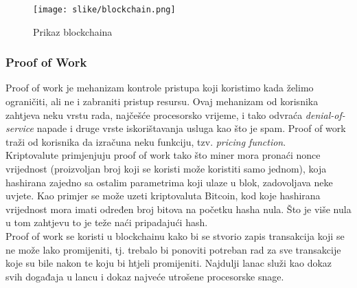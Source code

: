 \documentclass[12pt]{article}
\begin{document}
\begin{figure}[h!]
	\centering
	\texttt{[image: slike/blockchain.png]}
	\caption{Prikaz blockchaina}
\end{figure}


\subsubsection{Proof of Work}
Proof of work je mehanizam kontrole pristupa koji koristimo kada želimo ograničiti, ali ne i zabraniti pristup resursu. Ovaj mehanizam od korisnika zahtjeva neku vrstu rada, najčešće procesorsko vrijeme, i tako odvraća \textit{denial-of-service} napade i druge vrste iskorištavanja usluga kao što je spam. Proof of work traži od korisnika da izračuna neku funkciju, tzv. \textit{pricing function}.\cite{proof-of-work}\\
Kriptovalute primjenjuju proof of work tako što miner mora pronaći nonce vrijednost (proizvoljan broj koji se koristi može koristiti samo jednom), koja hashirana zajedno sa ostalim parametrima koji ulaze u blok, zadovoljava neke uvjete. Kao primjer se može uzeti kriptovaluta Bitcoin, kod koje hashirana vrijednost mora imati određen broj bitova na početku hasha nula. Što je više nula u tom zahtjevu to je teže naći pripadajući hash. \\
Proof of work se koristi u blockchainu kako bi se stvorio zapis transakcija koji se ne može lako promijeniti, tj. trebalo bi ponoviti potreban rad za sve transakcije koje su bile nakon te koju bi htjeli promijeniti. Najdulji lanac služi kao dokaz svih događaja u lancu i dokaz najveće utrošene procesorske snage.


\end{document}
